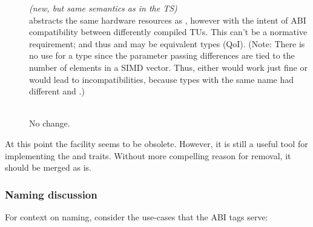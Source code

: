 \begin{description}
  \item[] \emph{(new, but same semantics as  in the TS)}\\
     abstracts the same hardware resources as , however with the intent of ABI compatibility between differently compiled TUs.
    This can't be a normative requirement; and thus  and  may be equivalent types (QoI).
    (Note: There is no use for a \simdabi{} type since the parameter passing differences are tied to the number of elements in a SIMD vector.
    Thus, either \simdabi{} would work just fine or \simdabi{} would lead to incompatibilities, because types with the same name had different  and .)

  \item[]\ \\
    No change.
\end{description}

At this point the \simdabi{} facility seems to be obsolete.
However, it is still a useful tool for implementing the  and  traits.
Without more compelling reason for removal, it should be merged as is.

\subsubsection{Naming discussion}

For context on naming, consider the use-cases that the ABI tags serve:


